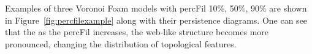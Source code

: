 \documentclass[12pt]{article}
\newcommand{\figref}[1]{Figure~\ref{#1}}
\begin{document}


Examples of three Voronoi Foam models with percFil 10\%, 50\%, 90\% are shown in \figref{fig:percfilexample} along with their persistence diagrams. One can see that the as the percFil increases, the web-like structure becomes more pronounced, changing the distribution of topological features.
\end{document}
